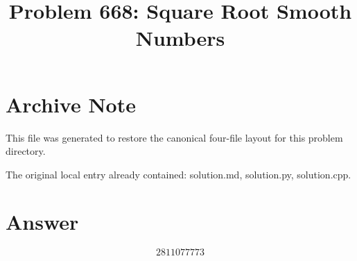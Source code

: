 \documentclass[11pt]{article}
\title{Problem 668: Square Root Smooth Numbers}
\author{}
\date{}
\begin{document}
\maketitle

\section{Archive Note}
This file was generated to restore the canonical four-file layout for this problem directory.

The original local entry already contained: solution.md, solution.py, solution.cpp.

\section{Answer}

\[
\boxed{2811077773}
\]
\end{document}
